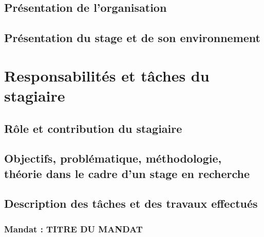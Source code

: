 \documentclass[12pt]{article} 	%
\begin{document}
\subsection{Présentation de l’organisation}

\subsection{Présentation du stage et de son environnement}


\newpage
\section{Responsabilités et tâches du stagiaire}  %

\subsection{Rôle et contribution du stagiaire}

\subsection{Objectifs, problématique, méthodologie, théorie dans le cadre d’un stage en recherche}  %

\subsection{Description des tâches et des travaux effectués}

\subsubsection{Mandat : TITRE DU MANDAT}
\end{document}
